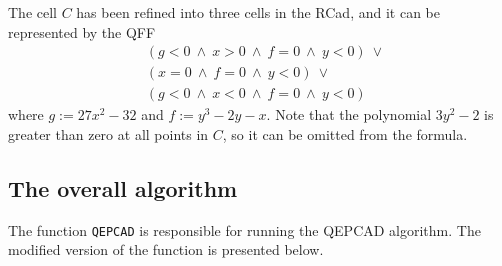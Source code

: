 \documentclass[
]{book}
\theoremstyle{definition}
\theoremstyle{definition}
\theoremstyle{definition}
\theoremstyle{definition}
\theoremstyle{remark}
\begin{document}
The cell \(C\) has been refined into three cells in the RCad, and it can be represented by the QFF
\begin{align*}
& (g < 0 \ \land\ x > 0\ \land\ f = 0\ \land\ y < 0)\ \lor\\
& (x = 0\ \land\ f = 0\ \land\ y < 0)\ \lor \\
& (g < 0\ \land\ x < 0\ \land\ f = 0\ \land\ y < 0)
\end{align*}
where \(g := 27 x^2 - 32\) and \(f := y^3 - 2 y - x\). Note that the polynomial \(3 y^2 - 2\) is greater than zero at all points in \(C\), so it can be omitted from the formula.

\hypertarget{the-overall-algorithm}{%
\subsection{The overall algorithm}\label{the-overall-algorithm}}

The function \texttt{QEPCAD} is responsible for running the QEPCAD algorithm. The modified version of the function is presented below.
\end{document}
